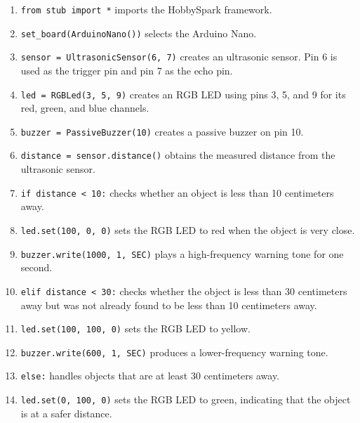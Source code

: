 \begin{enumerate}
    \item \texttt{from stub import *} imports the HobbySpark framework.

    \item \texttt{set\_board(ArduinoNano())} selects the Arduino Nano.

    \item \texttt{sensor = UltrasonicSensor(6, 7)} creates an ultrasonic
    sensor. Pin 6 is used as the trigger pin and pin 7 as the echo pin.

    \item \texttt{led = RGBLed(3, 5, 9)} creates an RGB LED using pins 3,
    5, and 9 for its red, green, and blue channels.

    \item \texttt{buzzer = PassiveBuzzer(10)} creates a passive buzzer on
    pin 10.

    \item \texttt{distance = sensor.distance()} obtains the measured distance
    from the ultrasonic sensor.

    \item \texttt{if distance < 10:} checks whether an object is less than
    10 centimeters away.

    \item \texttt{led.set(100, 0, 0)} sets the RGB LED to red when the object
    is very close.

    \item \texttt{buzzer.write(1000, 1, SEC)} plays a high-frequency warning
    tone for one second.

    \item \texttt{elif distance < 30:} checks whether the object is less than
    30 centimeters away but was not already found to be less than
    10 centimeters away.

    \item \texttt{led.set(100, 100, 0)} sets the RGB LED to yellow.

    \item \texttt{buzzer.write(600, 1, SEC)} produces a lower-frequency
    warning tone.

    \item \texttt{else:} handles objects that are at least 30 centimeters
    away.

    \item \texttt{led.set(0, 100, 0)} sets the RGB LED to green, indicating
    that the object is at a safer distance.
\end{enumerate}



